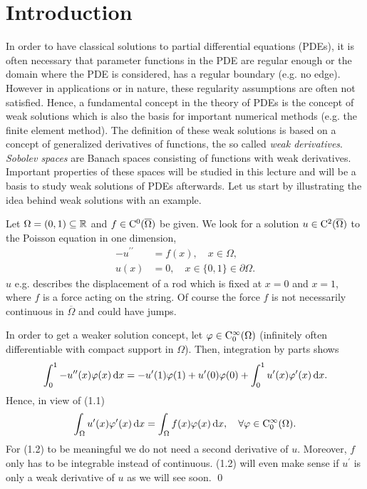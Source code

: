 \chapter{Introduction}

In order to have classical solutions to partial differential equations (PDEs), it is often necessary that parameter functions in the PDE are regular enough or the domain where the PDE is considered, has a regular boundary (e.g. no edge).
However in applications or in nature, these regularity assumptions are often not satisfied.
Hence, a fundamental concept in the theory of PDEs is the concept of weak solutions which is also the basis for important numerical methods (e.g. the finite element method).
The definition of these weak solutions is based on a concept of generalized derivatives of functions, the so called \emph{weak derivatives}. \emph{Sobolev spaces} are Banach spaces consisting of functions with weak derivatives.  
Important properties of these spaces will be studied in this lecture and will be a basis to study weak solutions of PDEs afterwards.  
Let us start by illustrating the idea behind weak solutions with an example.

\begin{ex}
  Let $\Omega = (0,1) \subseteq \mathbb{R}$ and $f \in \mathrm{C}^0(\overline \Omega)$ be given. 
  We look for a solution $u \in \mathrm{C}^2(\overline \Omega)$ to the Poisson equation in one dimension,
  \begin{align}
    -u^{\prime\prime} &= f(x), \quad x \in \Omega, \\
    u(x) &= 0, \quad x \in \{0,1\} \in \partial \Omega \nonumber.
  \end{align}
  $u$ e.g. describes the displacement of a rod which is fixed at $x = 0$ and $x = 1$, where $f$ is a force acting on the string.
  Of course the force $f$ is not necessarily continuous in $\overline\Omega$ and could have jumps.

  In order to get a weaker solution concept, let $\varphi \in \mathrm{C}_0^\infty(\Omega)$ (infinitely often differentiable with compact support in $\Omega$).
  Then, integration by parts shows
  $$
  \int_0^1 -u^{\prime\prime}(x) \varphi(x) \, {\operatorname{d}\!{x}} = -u^\prime(1) \varphi(1) + u^\prime(0)\varphi(0) + \int_0^1 u^\prime(x)\varphi^\prime(x) \, {\operatorname{d}\!{x}}.
  $$
  Hence, in view of (1.1)
  \begin{equation}
    \int_\Omega u^\prime(x)\varphi^\prime(x) \, {\operatorname{d}\!{x}} = \int_\Omega f(x)\varphi(x) \, {\operatorname{d}\!{x}}, \quad \forall \varphi \in \mathrm{C}_0^\infty(\Omega).
  \end{equation}
  For (1.2) to be meaningful we do not need a second derivative of $u$.
  Moreover, $f$ only has to be integrable instead of continuous. 
  (1.2) will even make sense if $u^\prime$ is only a weak derivative of $u$ as we will see soon. \qed
\end{ex}


